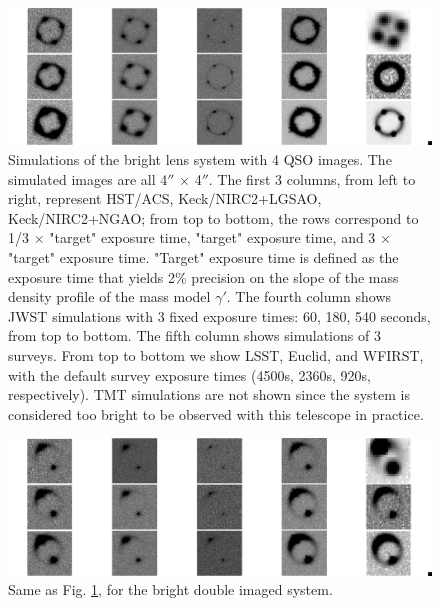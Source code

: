 \documentclass[a4paper,11pt]{article}
\begin{document}
{%
\begin{figure}
\begin{center}
\includegraphics[width=1.0\textwidth]{figures/brighter_system_4QSOimages_all.png}
\end{center}
\caption{Simulations of the bright lens system with 4 QSO images. The simulated images are all 4$''$ $\times$ 4$''$. The first 3 columns, from left to right, represent HST/ACS, Keck/NIRC2+LGSAO, Keck/NIRC2+NGAO; from top to bottom, the rows correspond to 1/3 $\times$ "target" exposure time, "target" exposure time, and 3 $\times$ "target" exposure time. "Target" exposure time is defined as the exposure time that yields 2\% precision on the slope of the mass density profile of the mass model $\gamma'$. The fourth column shows JWST simulations with 3 fixed exposure times: 60, 180, 540 seconds, from top to bottom. The fifth column
shows simulations of 3 surveys. From top to bottom we show LSST, Euclid, and WFIRST, with the default survey exposure times (4500s, 2360s, 920s, respectively). TMT simulations are not shown since the system is considered too bright to be observed with this telescope in practice.}
\label{fig:brighter_4QSOimages_montage}
\end{figure}


\begin{figure}
\begin{center}
\includegraphics[width=1.0\textwidth]{figures/brighter_system_2QSOimages_all.png}
\end{center}
\caption{Same as Fig. \ref{fig:brighter_4QSOimages_montage}, for the bright double imaged system.}
\label{fig:brighter_2QSOimages_montage}
\end{figure}


}
\end{document}

